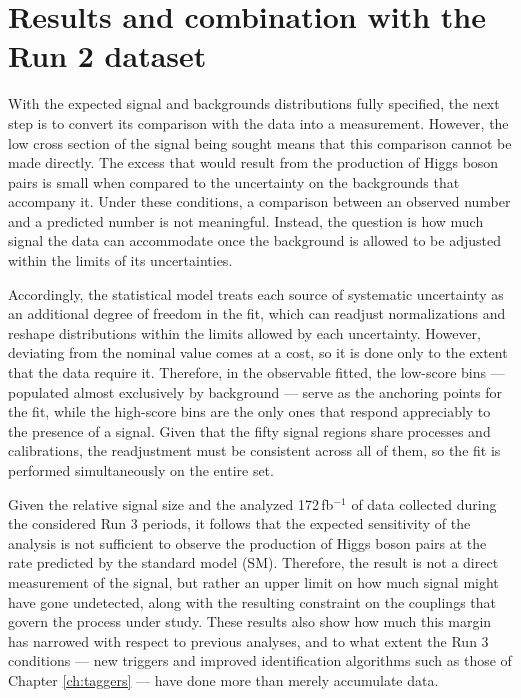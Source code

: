 \chapter{Results and combination with the Run 2 dataset}
\label{ch:bbtt_results}
%
With the expected signal and backgrounds distributions fully specified, the next step is to convert its comparison with the data into a measurement. However, the low cross section of the signal being sought means that this comparison cannot be made directly. The excess that would result from the production of Higgs boson pairs is small when compared to the uncertainty on the backgrounds that accompany it. Under these conditions, a comparison between an observed number and a predicted number is not meaningful. Instead, the question is how much signal the data can accommodate once the background is allowed to be adjusted within the limits of its uncertainties.

Accordingly, the statistical model treats each source of systematic uncertainty as an additional degree of freedom in the fit, which can readjust normalizations and reshape distributions within the limits allowed by each uncertainty. However, deviating from the nominal value comes at a cost, so it is done only to the extent that the data require it. Therefore, in the observable fitted, the low-score bins — populated almost exclusively by background — serve as the anchoring points for the fit, while the high-score bins are the only ones that respond appreciably to the presence of a signal. Given that the fifty signal regions share processes and calibrations, the readjustment must be consistent across all of them, so the fit is performed simultaneously on the entire set.

Given the relative signal size and the analyzed 172\,fb$^{-1}$ of data collected during the considered Run 3 periods, it follows that the expected sensitivity of the analysis is not sufficient to observe the production of Higgs boson pairs at the rate predicted by the standard model (SM). Therefore, the result is not a direct measurement of the signal, but rather an upper limit on how much signal might have gone undetected, along with the resulting constraint on the couplings that govern the process under study. These results also show how much this margin has narrowed with respect to previous analyses, and to what extent the Run 3 conditions — new triggers and improved identification algorithms such as those of Chapter \ref{ch:taggers} — have done more than merely accumulate data.

